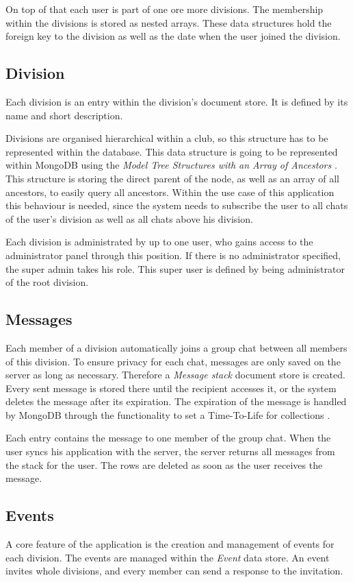 On top of that each user is part of one ore more divisions. The membership within the divisions is stored as nested arrays. These data structures hold the foreign key to the division as well as the date when the user joined the division.

\subsection{Division}
Each division is an entry within the division's document store. It is defined by its name and short description.

Divisions are organised hierarchical within a club, so this structure has to be represented within the database. This data structure is going to be represented within MongoDB using the \emph{Model Tree Structures with an Array of Ancestors} \cite[p. 149]{Mongo:2014aa}. This structure is storing the direct parent of the node, as well as an array of all ancestors, to easily query all ancestors. Within the use case of this application this behaviour is needed, since the system needs to subscribe the user to all chats of the user's division as well as all chats above his division.

Each division is administrated by up to one user, who gains access to the administrator panel through this position. If there is no administrator specified, the super admin takes his role. This super user is defined by being administrator of the root division.

\subsection{Messages}
Each member of a division automatically joins a group chat between all members of this division. To ensure privacy for each chat, messages are only saved on the server as long as necessary. Therefore a \emph{Message stack} document store is created. Every sent message is stored there until the recipient accesses it, or the system deletes the message after its expiration. The expiration of the message is handled by MongoDB through the functionality to set a Time-To-Life for collections \cite[p. 198]{Mongo:2014aa}.

Each entry contains the message to one member of the group chat. When the user syncs his application with the server, the server returns all messages from the stack for the user. The rows are deleted as soon as the user receives the message. 

\subsection{Events}
A core feature of the application is the creation and management of events for each division. The events are managed within the \emph{Event} data store. An event invites whole divisions, and every member can send a response to the invitation. 

